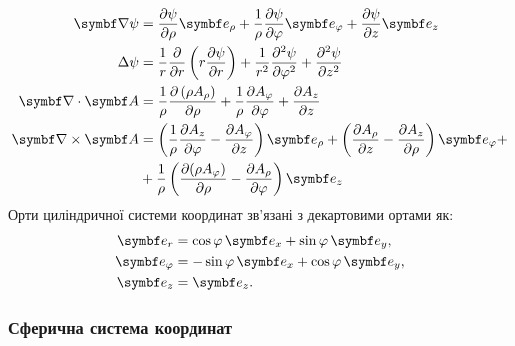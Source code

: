 \begin{align}\label{cylindric}
		\vect{\nabla}\psi & = \frac{\partial \psi}{\partial \rho} \vect{e}_{\rho} + \frac{1}{\rho}\frac{\partial \psi}{\partial \phi} \vect{e}_{\phi} + \frac{\partial \psi}{\partial z} \vect{e}_{z}                                                                                       \\
	\Laplasian\psi    & = \frac{1}{r} \frac{\partial }{\partial r} \left( r \frac{\partial \psi}{\partial r} \right) + \frac{1}{r^2} \frac{\partial^2 \psi}{\partial \phi^2} + \frac{\partial^2 \psi}{\partial z^2}                                                                   \\
	\divg\vect{A}     & = \frac{1}{\rho}\frac{\partial \left(\rho A_{\rho }\right)}{\partial \rho }+\frac{1}{\rho }\frac{\partial A_{\phi } }{\partial \phi }+\frac{\partial A_{z}}{\partial z}                                                                                    \\
	\rot\vect{A}      & =\left({\frac {1}{\rho }}{\frac {\partial A_{z}}{\partial \phi }}-{\frac {\partial A_{\phi }}{\partial z}}\right)\vect{e}_{\rho}+\left({\frac {\partial A_{\rho }}{\partial z}}-{\frac {\partial A_{z}}{\partial \rho }}\right)\vect{e}_{\phi} + \nonumber \\
	                  & +
	{\frac {1}{\rho }}\left({\frac {\partial (\rho A_{\phi })}{\partial \rho }}-{\frac {\partial A_{\rho }}{\partial \phi }}\right)\vect{e}_{z}
\end{align}
Орти циліндричної системи координат зв'язані з декартовими ортами як:
\begin{align}
    \vect{e}_r &= \cos\phi\, \vect{e}_x + \sin\phi\, \vect{e}_y, \\
    \vect{e}_{\phi} &= -\sin\phi\, \vect{e}_x + \cos\phi\, \vect{e}_y, \\
    \vect{e}_{z} &= \vect{e}_z.
\end{align}

\subsubsection{Сферична система координат}

